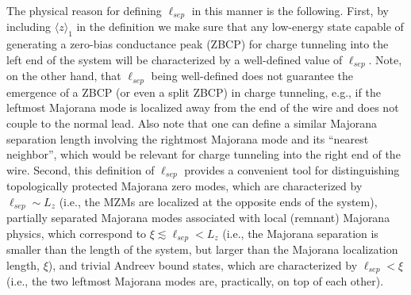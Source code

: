 \documentclass[aps,prmaterials,twocolumn,superscriptaddress,longbibliography]{revtex4-2}
\begin{document}
The physical reason for defining $\ell_{sep}$ in this manner is the following. First, by including $\langle z \rangle_1$ in the definition we make sure that any low-energy state capable of generating a zero-bias conductance peak (ZBCP) for charge tunneling into the left end of the system will be characterized by a well-defined value of $\ell_{sep}$. Note, on the other hand, that $\ell_{sep}$ being well-defined does not guarantee the emergence of a ZBCP (or even a split ZBCP) in charge tunneling, e.g., if the leftmost Majorana mode is localized away from the end of the wire and does not couple to the normal lead. Also note that one can define a similar Majorana separation length involving the rightmost Majorana mode and its ``nearest neighbor'', which would be relevant for charge tunneling into the right end of the wire. Second, this definition of $\ell_{sep}$ provides a convenient tool for distinguishing topologically protected Majorana zero modes, which are characterized by $\ell_{sep}\sim L_z$ (i.e., the MZMs are localized at the opposite ends of the system), partially separated Majorana modes associated with local (remnant) Majorana physics, which correspond to $\xi \lesssim \ell_{sep} < L_z$ (i.e., the Majorana separation is smaller than the length of the system, but larger than the Majorana localization length, $\xi$), and trivial Andreev bound states, which are characterized by $\ell_{sep}<\xi$ (i.e., the two leftmost Majorana modes are, practically, on top of each other).  
\end{document}
